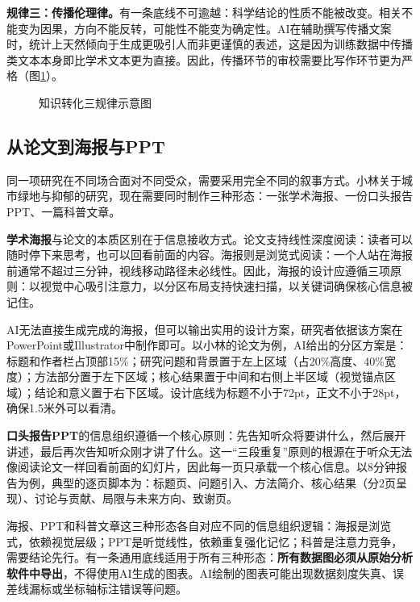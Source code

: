 \textbf{规律三：传播伦理律。}有一条底线不可逾越：科学结论的性质不能被改变。相关不能变为因果，方向不能反转，可能性不能变为确定性。AI在辅助撰写传播文案时，统计上天然倾向于生成更吸引人而非更谨慎的表述，这是因为训练数据中传播类文本本身即比学术文本更为直接。因此，传播环节的审校需要比写作环节更为严格（图\ref{fig:ch5_09}）。

\begin{figure}[H]
\centering
{}
\caption{知识转化三规律示意图}
\label{fig:ch5_09}
\end{figure}
\par

\subsection{从论文到海报与PPT}

同一项研究在不同场合面对不同受众，需要采用完全不同的叙事方式。小林关于城市绿地与抑郁的研究，现在需要同时制作三种形态：一张学术海报、一份口头报告PPT、一篇科普文章。

\textbf{学术海报}与论文的本质区别在于信息接收方式。论文支持线性深度阅读：读者可以随时停下来思考，也可以回看前面的内容。海报则是浏览式阅读：一个人站在海报前通常不超过三分钟，视线移动路径未必线性。因此，海报的设计应遵循三项原则：以视觉中心吸引注意力，以分区布局支持快速扫描，以关键词确保核心信息被记住。

AI无法直接生成完成的海报，但可以输出实用的设计方案，研究者依据该方案在PowerPoint或Illustrator中制作即可。以小林的论文为例，AI给出的分区方案是：标题和作者栏占顶部15\%；研究问题和背景置于左上区域（占20\%高度、40\%宽度）；方法部分置于左下区域；核心结果置于中间和右侧上半区域（视觉锚点区域）；结论和意义置于右下区域。设计底线为标题不小于72pt，正文不小于28pt，确保1.5米外可以看清。

\textbf{口头报告PPT}的信息组织遵循一个核心原则：先告知听众将要讲什么，然后展开讲述，最后再次告知听众刚才讲了什么。这一``三段重复''原则的根源在于听众无法像阅读论文一样回看前面的幻灯片，因此每一页只承载一个核心信息。以8分钟报告为例，典型的逐页脚本为：标题页、问题引入、方法简介、核心结果（分2页呈现）、讨论与贡献、局限与未来方向、致谢页。

海报、PPT和科普文章这三种形态各自对应不同的信息组织逻辑：海报是浏览式，依赖视觉层级；PPT是听觉线性，依赖重复强化记忆；科普是注意力竞争，需要结论先行。有一条通用底线适用于所有三种形态：\textbf{所有数据图必须从原始分析软件中导出}，不得使用AI生成的图表。AI绘制的图表可能出现数据刻度失真、误差线漏标或坐标轴标注错误等问题。


